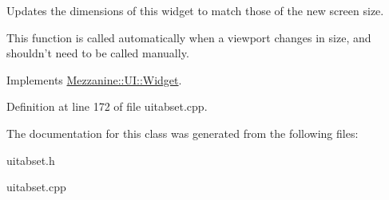 Updates the dimensions of this widget to match those of the new screen size. 

This function is called automatically when a viewport changes in size, and shouldn't need to be called manually. 

Implements \hyperlink{classMezzanine_1_1UI_1_1Widget_af23f919f2912ac10230953a848c9889c}{Mezzanine::UI::Widget}.



Definition at line 172 of file uitabset.cpp.



The documentation for this class was generated from the following files:\begin{DoxyCompactItemize}
\item 
uitabset.h\item 
uitabset.cpp\end{DoxyCompactItemize}
